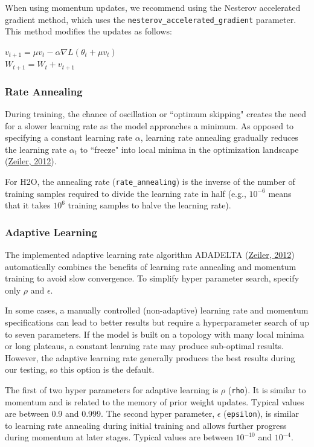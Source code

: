 When using momentum updates, we recommend using the Nesterov accelerated gradient method, which uses the \texttt{nesterov\_accelerated\_gradient} parameter. This method modifies the updates as follows: 
\begin{center}
$v_{t+1} = \mu v_t - \alpha \nabla L(\theta_t + \mu v_t)$
\\
$W_{t+1} = W_t + v_{t+1}$
\end{center}
\subsubsection{Rate Annealing} 
\label{sssec:RateAnnealing}

During training, the chance of oscillation or ``optimum skipping" creates the need for a slower learning rate as the model approaches a minimum. As opposed to specifying a constant learning rate $\alpha$, learning rate annealing gradually reduces the learning rate $\alpha_t$ to ``freeze" into local minima in the optimization landscape (\href{http://arxiv.org/pdf/1212.5701v1.pdf}{Zeiler, 2012}).  

For H2O, the annealing rate (\texttt{rate\_annealing}) is the inverse of the number of training samples required to divide the learning rate in half (e.g., $10^{-6}$ means that it takes $10^6$ training samples to halve the learning rate).

\newpage
\subsubsection{Adaptive Learning} 
\label{sssec:AdaptiveLearning}
The implemented adaptive learning rate algorithm ADADELTA (\href{http://arxiv.org/pdf/1212.5701v1.pdf}{Zeiler, 2012})  automatically combines the benefits of learning rate annealing and momentum training to avoid slow convergence. To simplify hyper parameter search, specify only $\rho$ and $\epsilon$. 

In some cases, a manually controlled (non-adaptive) learning rate and momentum specifications can lead to better results but require a hyperparameter search of up to seven parameters. If the model is built on a topology with many local minima or long plateaus, a constant learning rate may produce sub-optimal results. However, the adaptive learning rate generally produces the best results during our testing, so this option is the default. 

The first of two hyper parameters for adaptive learning is $\rho$ (\texttt{rho}). It is similar to momentum and is related to the memory of prior weight updates. Typical values are between 0.9 and 0.999. The second hyper parameter, $\epsilon$ (\texttt{epsilon}), is similar to learning rate annealing during initial training and allows further progress during momentum at later stages.
Typical values are between $10^{-10}$ and $10^{-4}$.

